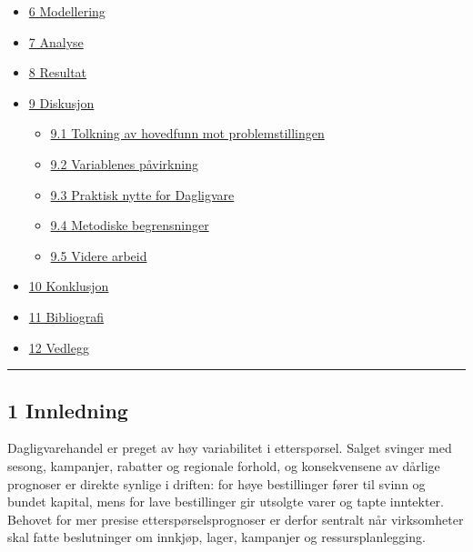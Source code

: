 \documentclass[
  11pt,
]{article}
\providecommand{\tightlist}{%
  \setlength{\itemsep}{0pt}\setlength{\parskip}{0pt}}
\begin{document}
\begin{itemize}
  \begin{itemize}
  \tightlist
  \item
    \protect\hyperlink{51-metode}{5.1 Metode}
  \item
    \protect\hyperlink{52-data}{5.2 Data}
  \end{itemize}
\item
  \protect\hyperlink{6-modellering}{6 Modellering}
\item
  \protect\hyperlink{7-analyse}{7 Analyse}
\item
  \protect\hyperlink{8-resultat}{8 Resultat}
\item
  \protect\hyperlink{9-diskusjon}{9 Diskusjon}

  \begin{itemize}
  \tightlist
  \item
    \protect\hyperlink{91-tolkning-av-hovedfunn-mot-problemstillingen}{9.1 Tolkning av hovedfunn mot problemstillingen}
  \item
    \protect\hyperlink{92-variablenes-puxe5virkning}{9.2 Variablenes påvirkning}
  \item
    \protect\hyperlink{93-praktisk-nytte-for-dagligvare}{9.3 Praktisk nytte for Dagligvare}
  \item
    \protect\hyperlink{94-metodiske-begrensninger}{9.4 Metodiske begrensninger}
  \item
    \protect\hyperlink{95-videre-arbeid}{9.5 Videre arbeid}
  \end{itemize}
\item
  \protect\hyperlink{10-konklusjon}{10 Konklusjon}
\item
  \protect\hyperlink{11-bibliografi}{11 Bibliografi}
\item
  \protect\hyperlink{12-vedlegg}{12 Vedlegg}
\end{itemize}

\begin{center}\rule{0.5\linewidth}{0.5pt}\end{center}

\hypertarget{innledning}{%
\subsection{1 Innledning}\label{innledning}}

Dagligvarehandel er preget av høy variabilitet i etterspørsel. Salget svinger med sesong, kampanjer, rabatter og
regionale forhold, og konsekvensene av dårlige prognoser er direkte synlige i driften: for høye bestillinger fører til
svinn og bundet kapital, mens for lave bestillinger gir utsolgte varer og tapte inntekter. Behovet for mer presise
etterspørselsprognoser er derfor sentralt når virksomheter skal fatte beslutninger om innkjøp, lager, kampanjer og
ressursplanlegging.
\end{document}
